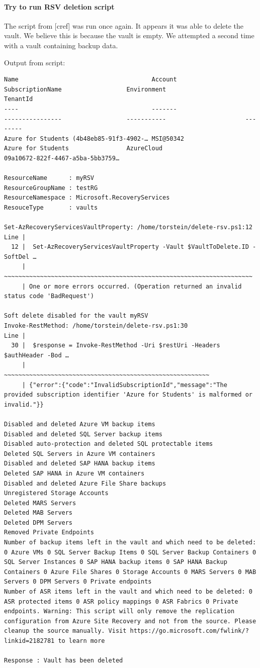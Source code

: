 \paragraph{Try to run RSV deletion script}
\label{sec:org5bccee7}
The script from [cref] was run once again.
It appears it was able to delete the vault.
We believe this is because the vault is empty.
We attempted a second time with a vault containing backup data.

Output from script:
\begin{verbatim}
Name                                     Account                           SubscriptionName                  Environment                      TenantId
----                                     -------                           ----------------                  -----------                      --------
Azure for Students (4b48eb85-91f3-4902-… MSI@50342                         Azure for Students                AzureCloud                       09a10672-822f-4467-a5ba-5bb3759…

ResourceName      : myRSV
ResourceGroupName : testRG
ResourceNamespace : Microsoft.RecoveryServices
ResouceType       : vaults

Set-AzRecoveryServicesVaultProperty: /home/torstein/delete-rsv.ps1:12
Line |
  12 |  Set-AzRecoveryServicesVaultProperty -Vault $VaultToDelete.ID -SoftDel …
     |  ~~~~~~~~~~~~~~~~~~~~~~~~~~~~~~~~~~~~~~~~~~~~~~~~~~~~~~~~~~~~~~~~~~~~~
     | One or more errors occurred. (Operation returned an invalid status code 'BadRequest')

Soft delete disabled for the vault myRSV
Invoke-RestMethod: /home/torstein/delete-rsv.ps1:30
Line |
  30 |  $response = Invoke-RestMethod -Uri $restUri -Headers $authHeader -Bod …
     |              ~~~~~~~~~~~~~~~~~~~~~~~~~~~~~~~~~~~~~~~~~~~~~~~~~~~~~~~~~
     | {"error":{"code":"InvalidSubscriptionId","message":"The provided subscription identifier 'Azure for Students' is malformed or invalid."}}

Disabled and deleted Azure VM backup items
Disabled and deleted SQL Server backup items
Disabled auto-protection and deleted SQL protectable items
Deleted SQL Servers in Azure VM containers
Disabled and deleted SAP HANA backup items
Deleted SAP HANA in Azure VM containers
Disabled and deleted Azure File Share backups
Unregistered Storage Accounts
Deleted MARS Servers
Deleted MAB Servers
Deleted DPM Servers
Removed Private Endpoints
Number of backup items left in the vault and which need to be deleted: 0 Azure VMs 0 SQL Server Backup Items 0 SQL Server Backup Containers 0 SQL Server Instances 0 SAP HANA backup items 0 SAP HANA Backup Containers 0 Azure File Shares 0 Storage Accounts 0 MARS Servers 0 MAB Servers 0 DPM Servers 0 Private endpoints
Number of ASR items left in the vault and which need to be deleted: 0 ASR protected items 0 ASR policy mappings 0 ASR Fabrics 0 Private endpoints. Warning: This script will only remove the replication configuration from Azure Site Recovery and not from the source. Please cleanup the source manually. Visit https://go.microsoft.com/fwlink/?linkid=2182781 to learn more

Response : Vault has been deleted
\end{verbatim}

